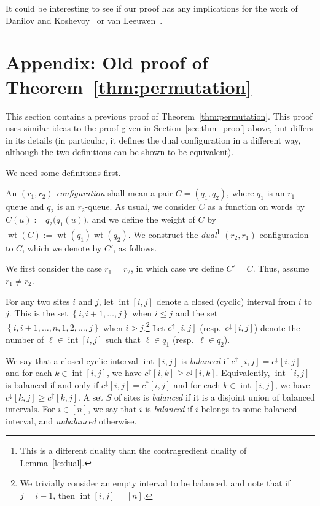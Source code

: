 \documentclass[reqno]{amsart}
\newcommand{\0}{\phantom{c}}
\DeclareMathOperator{\inter}{int} %
\DeclareMathOperator{\wt}{wt} %
\newenvironment{verlong}{}{}
\newcommand{\set}[1]{\left\{ #1 \right\}}
\newcommand{\ive}[1]{\left[ #1 \right]}
\newcommand{\defn}[1]{{\color{darkred}\emph{#1}}} %
\theoremstyle{plain}
\theoremstyle{definition}
\numberwithin{equation}{section}
\begin{document}
It could be interesting to see if our proof has any implications for the work of Danilov and Koshevoy~\cite{DanilovKoshevoy} or van Leeuwen~\cite{vanLeeuwen-dc}.




\begin{verlong}
\section{Appendix: Old proof of Theorem~\ref{thm:permutation}}
\label{sec:thm_proof-old6}

This section contains a previous proof of Theorem~\ref{thm:permutation}.
This proof uses similar ideas to the proof given in Section~\ref{sec:thm_proof} above,
but differs in its details (in particular, it defines the dual configuration
in a different way, although the two definitions can be shown to be equivalent).

We need some definitions first.

An \defn{$(r_1,r_2)$-configuration} shall mean a pair $C = (q_1, q_2)$, where $q_1$ is an $r_1$-queue and $q_2$ is an $r_2$-queue.
As usual, we consider $C$ as a function on words by $C(u) := q_2\bigr(q_1(u)\bigr)$, and we define the weight of $C$ by $\wt(C) := \wt(q_1) \wt(q_2)$.
We construct the \defn{dual}\footnote{This is a different duality than the contragredient duality of Lemma~\ref{le:dual}.} $(r_2,r_1)$-configuration to $C$, which we denote by $C'$, as follows.

We first consider the case $r_1 = r_2$, in which case we define $C' = C$.
Thus, assume $r_1 \neq r_2$.

For any two sites $i$ and $j$, let $\inter[i,j]$ denote a closed (cyclic) interval from $i$ to $j$.
This is the set $\set{i, i+1, \ldots, j}$ when $i \leq j$ and the set $\set{i, i+1, \ldots, n, 1, 2, \ldots, j}$ when $i > j$.\footnote{We trivially consider an empty interval to be balanced, and note that if $j = i-1$, then $\inter[i,j] = \ive{n}$.}
Let $c^{\uparrow}[i,j]$ (resp.~$c^{\downarrow}[i,j]$) denote the number of $\ell \in \inter[i,j]$ such that $\ell \in q_1$ (resp.~$\ell \in q_2$).

We say that a closed cyclic interval $\inter[i,j]$ is \defn{balanced} if $c^{\uparrow}[i,j] = c^{\downarrow}[i,j]$ and for each $k \in \inter[i,j]$, we have $c^\uparrow[i,k] \geq c^\downarrow[i,k]$.
Equivalently, $\inter[i,j]$ is balanced if and only if $c^{\downarrow}[i,j] = c^{\uparrow}[i,j]$ and for each $k \in \inter[i,j]$, we have $c^\downarrow[k,j] \geq c^\uparrow[k,j]$.
A set $S$ of sites is \defn{balanced} if it is a disjoint union of balanced intervals.
For $i \in \ive{n}$, we say that $i$ is \defn{balanced} if $i$ belongs to some balanced interval, and \defn{unbalanced} otherwise.


\end{verlong}
\end{document}

